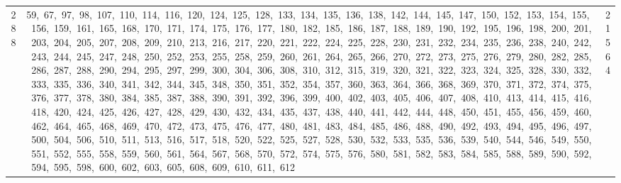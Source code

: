 \begin{longtable}{c|p{}|r}
288 & 59,\ 67,\ 97,\ 98,\ 107,\ 110,\ 114,\ 116,\ 120,\ 124,\ 125,\ 128,\ 133,\ 134,\ 135,\ 136,\ 138,\ 142,\ 144,\ 145,\ 147,\ 150,\ 152,\ 153,\ 154,\ 155,\ 156,\ 159,\ 161,\ 165,\ 168,\ 170,\ 171,\ 174,\ 175,\ 176,\ 177,\ 180,\ 182,\ 185,\ 186,\ 187,\ 188,\ 189,\ 190,\ 192,\ 195,\ 196,\ 198,\ 200,\ 201,\ 203,\ 204,\ 205,\ 207,\ 208,\ 209,\ 210,\ 213,\ 216,\ 217,\ 220,\ 221,\ 222,\ 224,\ 225,\ 228,\ 230,\ 231,\ 232,\ 234,\ 235,\ 236,\ 238,\ 240,\ 242,\ 243,\ 244,\ 245,\ 247,\ 248,\ 250,\ 252,\ 253,\ 255,\ 258,\ 259,\ 260,\ 261,\ 264,\ 265,\ 266,\ 270,\ 272,\ 273,\ 275,\ 276,\ 279,\ 280,\ 282,\ 285,\ 286,\ 287,\ 288,\ 290,\ 294,\ 295,\ 297,\ 299,\ 300,\ 304,\ 306,\ 308,\ 310,\ 312,\ 315,\ 319,\ 320,\ 321,\ 322,\ 323,\ 324,\ 325,\ 328,\ 330,\ 332,\ 333,\ 335,\ 336,\ 340,\ 341,\ 342,\ 344,\ 345,\ 348,\ 350,\ 351,\ 352,\ 354,\ 357,\ 360,\ 363,\ 364,\ 366,\ 368,\ 369,\ 370,\ 371,\ 372,\ 374,\ 375,\ 376,\ 377,\ 378,\ 380,\ 384,\ 385,\ 387,\ 388,\ 390,\ 391,\ 392,\ 396,\ 399,\ 400,\ 402,\ 403,\ 405,\ 406,\ 407,\ 408,\ 410,\ 413,\ 414,\ 415,\ 416,\ 418,\ 420,\ 424,\ 425,\ 426,\ 427,\ 428,\ 429,\ 430,\ 432,\ 434,\ 435,\ 437,\ 438,\ 440,\ 441,\ 442,\ 444,\ 448,\ 450,\ 451,\ 455,\ 456,\ 459,\ 460,\ 462,\ 464,\ 465,\ 468,\ 469,\ 470,\ 472,\ 473,\ 475,\ 476,\ 477,\ 480,\ 481,\ 483,\ 484,\ 485,\ 486,\ 488,\ 490,\ 492,\ 493,\ 494,\ 495,\ 496,\ 497,\ 500,\ 504,\ 506,\ 510,\ 511,\ 513,\ 516,\ 517,\ 518,\ 520,\ 522,\ 525,\ 527,\ 528,\ 530,\ 532,\ 533,\ 535,\ 536,\ 539,\ 540,\ 544,\ 546,\ 549,\ 550,\ 551,\ 552,\ 555,\ 558,\ 559,\ 560,\ 561,\ 564,\ 567,\ 568,\ 570,\ 572,\ 574,\ 575,\ 576,\ 580,\ 581,\ 582,\ 583,\ 584,\ 585,\ 588,\ 589,\ 590,\ 592,\ 594,\ 595,\ 598,\ 600,\ 602,\ 603,\ 605,\ 608,\ 609,\ 610,\ 611,\ 612 & 21564 \\

\end{longtable}

